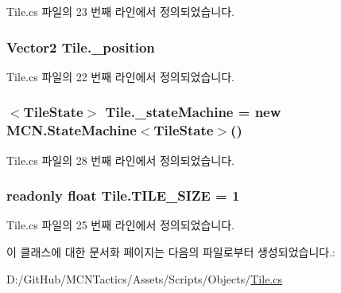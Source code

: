 Tile.\+cs 파일의 23 번째 라인에서 정의되었습니다.

\subsubsection[{\texorpdfstring{\+\_\+position}{_position}}]{\setlength{\rightskip}{0pt plus 5cm}Vector2 Tile.\+\_\+position\hspace{0.3cm}{\ttfamily [private]}}\hypertarget{class_tile_a56d02616cede51da0afdceff82ca958d}{}\label{class_tile_a56d02616cede51da0afdceff82ca958d}


Tile.\+cs 파일의 22 번째 라인에서 정의되었습니다.

\subsubsection[{\texorpdfstring{\+\_\+state\+Machine}{_stateMachine}}]{$<${\bf Tile\+State}$>$ Tile.\+\_\+state\+Machine = new {\bf M\+C\+N.\+State\+Machine}$<${\bf Tile\+State}$>$()\hspace{0.3cm}{\ttfamily [private]}}\hypertarget{class_tile_a822a1bffe56b1193b8c5c61070ea7827}{}\label{class_tile_a822a1bffe56b1193b8c5c61070ea7827}


Tile.\+cs 파일의 28 번째 라인에서 정의되었습니다.

\subsubsection[{\texorpdfstring{T\+I\+L\+E\+\_\+\+S\+I\+ZE}{TILE_SIZE}}]{\setlength{\rightskip}{0pt plus 5cm}readonly float Tile.\+T\+I\+L\+E\+\_\+\+S\+I\+ZE = 1\hspace{0.3cm}{\ttfamily [static]}}\hypertarget{class_tile_a51b7dea4344573ba12a461a32517e683}{}\label{class_tile_a51b7dea4344573ba12a461a32517e683}


Tile.\+cs 파일의 25 번째 라인에서 정의되었습니다.



이 클래스에 대한 문서화 페이지는 다음의 파일로부터 생성되었습니다.\+:\begin{DoxyCompactItemize}
\item 
D\+:/\+Git\+Hub/\+M\+C\+N\+Tactics/\+Assets/\+Scripts/\+Objects/\hyperlink{_tile_8cs}{Tile.\+cs}\end{DoxyCompactItemize}
